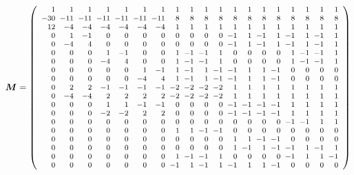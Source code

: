 \begin{displaymath}
\footnotesize
\bm M = \left(
\begin{array}{*{19}{@{\hspace{5pt}}r}}
 1 & 1 & 1 & 1 & 1 & 1 & 1 & 1 & 1 & 1 & 1 & 1 & 1 & 1 & 1 & 1 & 1 & 1 & 1 \\
 -30 & -11 & -11 & -11 & -11 & -11 & -11 & 8 & 8 & 8 & 8 & 8 & 8 & 8 & 8 & 8 & 8 & 8 & 8 \\
 12 & -4 & -4 & -4 & -4 & -4 & -4 & 1 & 1 & 1 & 1 & 1 & 1 & 1 & 1 & 1 & 1 & 1 & 1 \\
 0 & 1 & -1 & 0 & 0 & 0 & 0 & 0 & 0 & 0 & 0 & -1 & 1 & -1 & 1 & -1 & 1 & -1 & 1 \\
 0 & -4 & 4 & 0 & 0 & 0 & 0 & 0 & 0 & 0 & 0 & -1 & 1 & -1 & 1 & -1 & 1 & -1 & 1 \\
 0 & 0 & 0 & 1 & -1 & 0 & 0 & 1 & -1 & -1 & 1 & 0 & 0 & 0 & 0 & 1 & -1 & -1 & 1 \\
 0 & 0 & 0 & -4 & 4 & 0 & 0 & 1 & -1 & -1 & 1 & 0 & 0 & 0 & 0 & 1 & -1 & -1 & 1 \\
 0 & 0 & 0 & 0 & 0 & 1 & -1 & 1 & -1 & 1 & -1 & -1 & 1 & 1 & -1 & 0 & 0 & 0 & 0 \\
 0 & 0 & 0 & 0 & 0 & -4 & 4 & 1 & -1 & 1 & -1 & -1 & 1 & 1 & -1 & 0 & 0 & 0 & 0 \\
 0 & 2 & 2 & -1 & -1 & -1 & -1 & -2 & -2 & -2 & -2 & 1 & 1 & 1 & 1 & 1 & 1 & 1 & 1 \\
 0 & -4 & -4 & 2 & 2 & 2 & 2 & -2 & -2 & -2 & -2 & 1 & 1 & 1 & 1 & 1 & 1 & 1 & 1 \\
 0 & 0 & 0 & 1 & 1 & -1 & -1 & 0 & 0 & 0 & 0 & -1 & -1 & -1 & -1 & 1 & 1 & 1 & 1 \\
 0 & 0 & 0 & -2 & -2 & 2 & 2 & 0 & 0 & 0 & 0 & -1 & -1 & -1 & -1 & 1 & 1 & 1 & 1 \\
 0 & 0 & 0 & 0 & 0 & 0 & 0 & 0 & 0 & 0 & 0 & 0 & 0 & 0 & 0 & -1 & -1 & 1 & 1 \\
 0 & 0 & 0 & 0 & 0 & 0 & 0 & 1 & 1 & -1 & -1 & 0 & 0 & 0 & 0 & 0 & 0 & 0 & 0 \\
 0 & 0 & 0 & 0 & 0 & 0 & 0 & 0 & 0 & 0 & 0 & 1 & 1 & -1 & -1 & 0 & 0 & 0 & 0 \\
 0 & 0 & 0 & 0 & 0 & 0 & 0 & 0 & 0 & 0 & 0 & 1 & -1 & 1 & -1 & -1 & 1 & -1 & 1 \\
 0 & 0 & 0 & 0 & 0 & 0 & 0 & 1 & -1 & -1 & 1 & 0 & 0 & 0 & 0 & -1 & 1 & 1 & -1 \\
 0 & 0 & 0 & 0 & 0 & 0 & 0 & -1 & 1 & -1 & 1 & -1 & 1 & 1 & -1 & 0 & 0 & 0 & 0
\end{array}
\right)
\end{displaymath}
